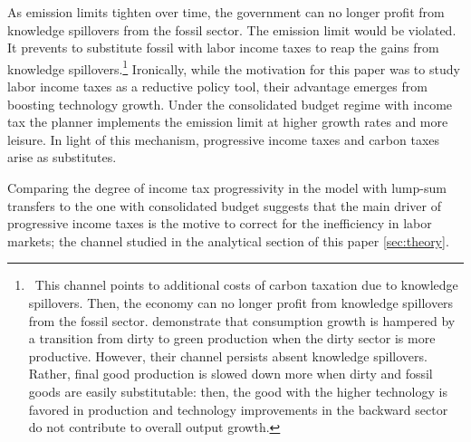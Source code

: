 As emission limits tighten over time, the government can no longer profit from knowledge spillovers from the fossil sector. The emission limit would be violated. It prevents to substitute fossil with labor income taxes to reap the gains from knowledge spillovers.\footnote{\ This channel points to additional costs of carbon taxation due to knowledge spillovers. Then, the economy can no longer profit from knowledge spillovers from the fossil sector. \cite{Acemoglu2012TheChange} demonstrate that consumption growth is hampered by a transition from dirty to green production when the dirty sector is more productive. However, their channel persists absent knowledge spillovers. Rather, final good production is slowed down more when dirty and fossil goods are easily substitutable: then, the good with the higher technology is favored in production and technology improvements in the backward sector do not contribute to overall output growth.} 
Ironically, while the motivation for this paper was to study labor income taxes as a reductive policy tool, their advantage emerges from boosting technology growth. Under the consolidated budget regime with income tax the planner implements the emission limit at higher growth rates and more leisure. In light of this mechanism, progressive income taxes and carbon taxes arise as substitutes. 

Comparing the degree of income tax progressivity in the model with lump-sum transfers to the one with consolidated budget suggests that the main driver of progressive income taxes is the motive to correct for the inefficiency in labor markets; the channel studied in the analytical section of this paper \ref{sec:theory}. 

